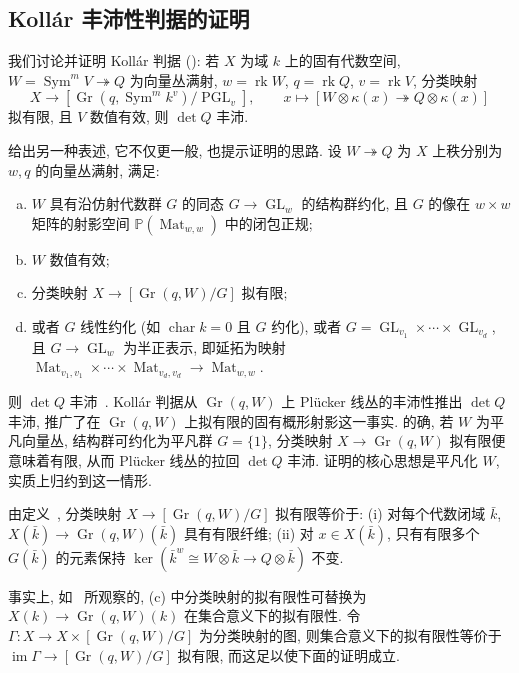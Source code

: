 \subsection{Kollár 丰沛性判据的证明}\label{src:6.9.3-subsection}
我们讨论并证明 Kollár 判据 (): 若 $X$ 为域 $k$ 上的固有代数空间, $W=\operatorname{Sym}^mV\twoheadrightarrow Q$ 为向量丛满射, $w=\operatorname{rk}W$, $q=\operatorname{rk}Q$, $v=\operatorname{rk}V$, 分类映射
\[
X\longrightarrow[\operatorname{Gr}(q,\operatorname{Sym}^mk^v)/\operatorname{PGL}_v],\qquad x\longmapsto[W\otimes\kappa(x)\twoheadrightarrow Q\otimes\kappa(x)]
\]
拟有限, 且 $V$ 数值有效, 则 $\det Q$ 丰沛.
\begin{remark}[更一般的表述]\label{src:6.9.12}
给出另一种表述, 它不仅更一般, 也提示证明的思路. 设 $W\twoheadrightarrow Q$ 为 $X$ 上秩分别为 $w,\allowbreak q$ 的向量丛满射, 满足:
\begin{enumerate}[(a)]
\item $W$ 具有沿仿射代数群 $G$ 的同态 $G\to\operatorname{GL}_w$ 的结构群约化, 且 $G$ 的像在 $w\times w$ 矩阵的射影空间 $\mathbb P(\operatorname{Mat}_{w,\allowbreak w})$ 中的闭包正规;
\item $W$ 数值有效;
\item 分类映射 $X\to[\operatorname{Gr}(q,\allowbreak W)/G]$ 拟有限;
\item 或者 $G$ 线性约化 (如 $\operatorname{char}k=0$ 且 $G$ 约化), 或者 $G=\operatorname{GL}_{v_1}\times\cdots\times\operatorname{GL}_{v_d}$, 且 $G\to\operatorname{GL}_w$ 为半正表示, 即延拓为映射 $\operatorname{Mat}_{v_1,\allowbreak v_1}\times\cdots\times\operatorname{Mat}_{v_d,\allowbreak v_d}\to\operatorname{Mat}_{w,\allowbreak w}$.
\end{enumerate}
则 $\det Q$ 丰沛~\cite[命题 3.6, 引理 3.9]{Kol90}. Kollár 判据从 $\operatorname{Gr}(q,\allowbreak W)$ 上 Plücker 线丛的丰沛性推出 $\det Q$ 丰沛, 推广了在 $\operatorname{Gr}(q,\allowbreak W)$ 上拟有限的固有概形射影这一事实. 的确, 若 $W$ 为平凡向量丛, 结构群可约化为平凡群 $G=\{1\}$, 分类映射 $X\to\operatorname{Gr}(q,\allowbreak W)$ 拟有限便意味着有限, 从而 Plücker 线丛的拉回 $\det Q$ 丰沛. 证明的核心思想是平凡化 $W$, 实质上归约到这一情形.
\end{remark}
\begin{remark}[展开拟有限性条件]\label{src:6.9.13}
由定义~, 分类映射 $X\to[\operatorname{Gr}(q,\allowbreak W)/G]$ 拟有限等价于: (i) 对每个代数闭域 $\bar k$, $X(\bar k)\to\operatorname{Gr}(q,\allowbreak W)(\bar k)$ 具有有限纤维; (ii) 对 $x\in X(\bar k)$, 只有有限多个 $G(\bar k)$ 的元素保持 $\ker(\bar k^w\cong W\otimes\bar k\to\allowbreak Q\otimes\bar k)$ 不变.

事实上, 如~\cite[定理 5.1]{KP17} 所观察的, (c) 中分类映射的拟有限性可替换为 $X(k)\to\operatorname{Gr}(q,\allowbreak W)(k)$ 在集合意义下的拟有限性. 令 $\Gamma:X\to\allowbreak X\times[\operatorname{Gr}(q,\allowbreak W)/G]$ 为分类映射的图, 则集合意义下的拟有限性等价于 $\operatorname{im}\Gamma\to[\operatorname{Gr}(q,\allowbreak W)/G]$ 拟有限, 而这足以使下面的证明成立.
\end{remark}
